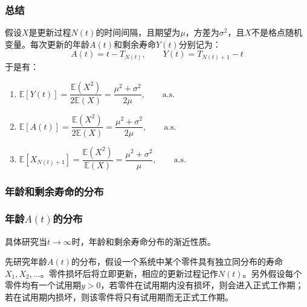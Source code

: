 \documentclass[t]{beamer}
\newcommand{\E}{\mathbb{E}}
\begin{document}
\begin{frame}
  \frametitle{总结}
  假设$X$是更新过程$N(t)$的时间间隔，且期望为$\mu$，方差为$\sigma^2$，且$X$不是格点随机变量。每次更新的年龄$A(t)$和剩余寿命$Y(t)$分别记为：
  \[A(t)=t-T_{N(t)},\qquad Y(t)=T_{N(t)+1}-t\]
  于是有：
  \begin{enumerate}
      \item $\E[Y(t)]=\dfrac{\E(X^2)}{2\E(X)}=\dfrac{\mu^2+\sigma^2}{2\mu},\qquad \text{a.s.}$
      \item $\E[A(t)]=\dfrac{\E(X^2)}{2\E(X)}=\dfrac{\mu^2+\sigma^2}{2\mu},\qquad \text{a.s.}$
      \item $\E[X_{N(t)+1}]=\dfrac{\E(X^2)}{\E(X)}=\dfrac{\mu^2+\sigma^2}{\mu},\qquad \text{a.s.}$
  \end{enumerate}
\end{frame}


\subsubsection{年龄和剩余寿命的分布}
\begin{frame}
  \frametitle{年龄$A(t)$的分布}
  具体研究当$t\to\infty$时，年龄和剩余寿命分布的渐近性质。

  先研究年龄$A(t)$的分布，假设一个系统中某个零件具有独立同分布的寿命$X_1,X_2,\ldots$。零件损坏后将立即更新，相应的更新过程记作$N(t)$。另外假设每个零件均有一个试用期$y>0$，若零件在试用期内没有损坏，则会进入正式工作期；若在试用期内损坏，则该零件将只有试用期而无正式工作期。
  
\begin{center}
\end{center}
\end{frame}
\end{document}
